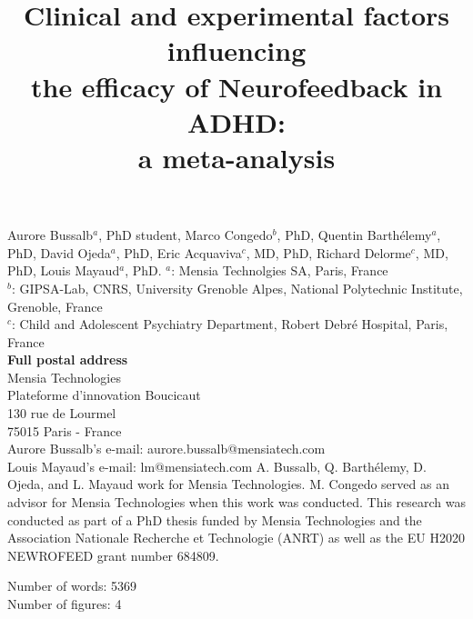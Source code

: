 

\title{Clinical and experimental factors influencing \\ the efficacy of Neurofeedback in ADHD: \\ a meta-analysis} %
\maketitle
\noindent Aurore Bussalb$^a$, PhD student, Marco Congedo$^b$, PhD, Quentin Barth\'elemy$^a$, PhD, David Ojeda$^a$, PhD, 
Eric Acquaviva$^c$, MD, PhD, Richard Delorme$^c$, MD, PhD, Louis Mayaud$^a$, PhD. 
\smallbreak
\noindent $^a$: Mensia Technolgies SA, Paris, France \\
\noindent $^b$: GIPSA-Lab, CNRS, University Grenoble Alpes, National Polytechnic Institute, Grenoble, France \\
\noindent $^c$: Child and Adolescent Psychiatry Department, Robert Debré Hospital, Paris, France \\ 
\smallbreak
\noindent\textbf{Full postal address} \\
Mensia Technologies \\
Plateforme d'innovation Boucicaut \\
130 rue de Lourmel \\
75015 Paris - France \\
Aurore Bussalb's e-mail: aurore.bussalb@mensiatech.com \\
Louis Mayaud's e-mail: lm@mensiatech.com 
\smallbreak
\noindent A. Bussalb, Q. Barth\'elemy, D. Ojeda, and L. Mayaud work for Mensia Technologies.
M. Congedo served as an advisor for Mensia Technologies when this work was conducted. 
\smallbreak
\noindent This research was conducted as part of a PhD thesis funded by Mensia Technologies and the Association Nationale 
Recherche et Technologie (ANRT) as well as the EU H2020 NEWROFEED grant number 684809.

\noindent Number of words: 5369 \\
\noindent Number of figures: 4 
